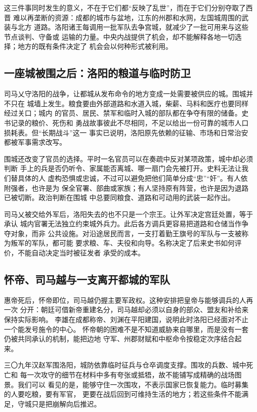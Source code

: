 这三件事同时发生的意义，不在于它们都“反映了乱世”，而在于它们分别夺取了西晋
难以再垄断的资源：成都的城市与盆地，江东的州郡和水网，左国城周围的武装与北方
道路。洛阳诸王每调用一批军队去争宫城，就减少了一批可用来与这些节点谈判、守备或
运输的力量。中央内战提供了机会，却不能解释各地一切选择；地方的既有条件决定了
机会会以何种形式被利用。

\subsection{一座城被围之后：洛阳的粮道与临时防卫}

司马乂守洛阳的战争，让都城从发布命令的地方变成一处需要被供应的城。围城并不只在
城墙上发生。粮食要由外部道路和水道入城，柴薪、马料和医疗也要同样经过关口；城内
的官员、居民、禁军和临时入城的部队都在争夺有限的储备。史书记录的粮价、死伤和
勇战故事彼此不尽相同，不足以给出一份可靠的城市人口损耗表。但“长期战斗”这一
事实已说明，洛阳原先依赖的征输、市场和日常治安都被军事需求改写。

围城还改变了官员的选择。平时一名官员可以在奏疏中反对某项政策，城中却必须判断
手上的兵是否仍听令、家属能否离城、哪一扇门会先被打开。史料无法让我们替具体的人
虚构恐惧或忠诚，不过可以避免把他们简单分成“忠”“奸”。有人依附强者，也许是为
保全官署、部曲或家族；有人坚持原有阵营，也许是因为退路已被切断。政治判断在围城
中总要同粮食、道路和可动用的武装一起作出。

司马乂被交给外军后，洛阳失去的也不只是一个宗王。让外军决定宫廷处置，等于承认
城内官署无法独立约束城外兵力。此后各方调兵更容易把道路和仓储当作争夺对象，而非
公共设施。对沿途居民而言，一支打着勤王旗号的军队与一支被称为叛军的军队，都可能
要求粮、车、夫役和向导。名称决定了后来史书如何评价，不能自动决定当时被征发者
承受的成本。

\subsection{怀帝、司马越与一支离开都城的军队}

惠帝死后，怀帝即位，司马越仍握主要军政权。这种安排把皇帝与能够调兵的人再一次
分开：朝廷可借新帝重建名分，司马越却必须以自身的部众、盟友和补给来保持实际影响。
李雄在成都称帝、刘渊在平阳建国，说明此时洛阳已经面对不止一个能发号施令的中心。
怀帝朝的困难不是不知道威胁来自哪里，而是没有一套仍被共同承认的机制，能把边地
守军、州郡财赋和中枢命令按稳定次序结合起来。

三〇九年汉赵军围洛阳，城防依靠临时征兵与仓卒调度支撑。围攻的兵数、城中死亡和
每一次攻守的细节在材料中多有夸张或抵牾，故不能铺写成精确的战场图景。我们可以
看见的是，能够守住一次围攻，不表示国家已恢复能力。临时募集的人要吃粮，要有军官，
更要在战后回到可维持生活的地方；若这些条件不能满足，守城只是把崩解向后推迟。

